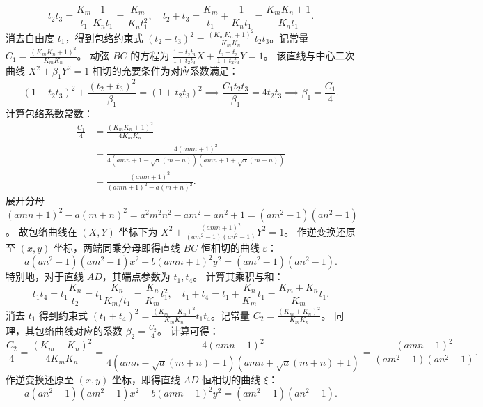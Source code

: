 \begin{solution}
\[ t_2 t_3 = \frac{K_m}{t_1} \frac{1}{K_n t_1} = \frac{K_m}{K_n t_1^2}, \quad t_2 + t_3 = \frac{K_m}{t_1} + \frac{1}{K_n t_1} = \frac{K_m K_n + 1}{K_n t_1}. \]
消去自由度 $t_1$，得到包络约束式 $(t_2 + t_3)^2 = \frac{(K_m K_n + 1)^2}{K_m K_n} t_2 t_3$。记常量 $C_1 = \frac{(K_m K_n + 1)^2}{K_m K_n}$。
动弦 $BC$ 的方程为 $\frac{1 - t_2 t_3}{1 + t_2 t_3} X + \frac{t_2 + t_3}{1 + t_2 t_3} Y = 1$。
该直线与中心二次曲线 $X^2 + \beta_1 Y^2 = 1$ 相切的充要条件为对应系数满足：
\[ (1 - t_2 t_3)^2 + \frac{(t_2 + t_3)^2}{\beta_1} = (1 + t_2 t_3)^2 \implies \frac{C_1 t_2 t_3}{\beta_1} = 4 t_2 t_3 \implies \beta_1 = \frac{C_1}{4}. \]
计算包络系数常数：
\[
\begin{aligned}
\frac{C_1}{4}
&= \frac{(K_m K_n + 1)^2}{4 K_m K_n} \\
&= \frac{4(amn + 1)^2}{4(amn + 1 - \sqrt{a}(m+n))(amn + 1 + \sqrt{a}(m+n))} \\
&= \frac{(amn + 1)^2}{(amn + 1)^2 - a(m+n)^2}.
\end{aligned}
\]
展开分母 $(amn + 1)^2 - a(m+n)^2 = a^2 m^2 n^2 - am^2 - an^2 + 1 = (am^2 - 1)(an^2 - 1)$。
故包络曲线在 $(X, Y)$ 坐标下为 $X^2 + \frac{(amn + 1)^2}{(am^2 - 1)(an^2 - 1)} Y^2 = 1$。
作逆变换还原至 $(x, y)$ 坐标，两端同乘分母即得直线 $BC$ 恒相切的曲线 $\varepsilon$：
\[ a(an^2 - 1)(am^2 - 1)x^2 + b(amn + 1)^2 y^2 = (am^2 - 1)(an^2 - 1). \]
特别地，对于直线 $AD$，其端点参数为 $t_1, t_4$。
计算其乘积与和：
\[ t_1 t_4 = t_1 \frac{K_n}{t_2} = t_1 \frac{K_n}{K_m / t_1} = \frac{K_n}{K_m} t_1^2, \quad t_1 + t_4 = t_1 + \frac{K_n}{K_m} t_1 = \frac{K_m + K_n}{K_m} t_1. \]
消去 $t_1$ 得到约束式 $(t_1 + t_4)^2 = \frac{(K_m + K_n)^2}{K_m K_n} t_1 t_4$。记常量 $C_2 = \frac{(K_m + K_n)^2}{K_m K_n}$。
同理，其包络曲线对应的系数 $\beta_2 = \frac{C_2}{4}$。
计算可得：
\[ \frac{C_2}{4} = \frac{(K_m + K_n)^2}{4 K_m K_n} = \frac{4(amn - 1)^2}{4(amn - \sqrt{a}(m+n) + 1)(amn + \sqrt{a}(m+n) + 1)} = \frac{(amn - 1)^2}{(am^2 - 1)(an^2 - 1)}. \]
作逆变换还原至 $(x, y)$ 坐标，即得直线 $AD$ 恒相切的曲线 $\xi$：
\[ a(an^2 - 1)(am^2 - 1)x^2 + b(amn - 1)^2 y^2 = (am^2 - 1)(an^2 - 1). \]

\end{solution}





